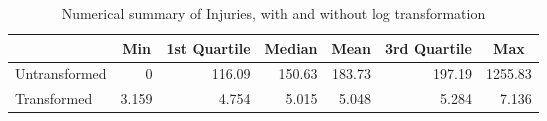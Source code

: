 \begin{table}[h!]
\centering
\begin{tabular}{|l|r|r|r|r|r|r|}
\hline
\rowcolor[HTML]{E7EAF6} 
\multicolumn{1}{|c|}{\textbf{}} & \multicolumn{1}{c|}{Min} & \multicolumn{1}{c|}{1st Quartile} & \multicolumn{1}{c|}{Median} & \multicolumn{1}{c|}{Mean} & \multicolumn{1}{c|}{3rd Quartile} & \multicolumn{1}{c|}{Max} \\ \hline
Untransformed & 0 & 116.09 & 150.63 & 183.73 & 197.19 & 1255.83 \\ \hline
Transformed & 3.159 & 4.754 & 5.015 & 5.048 & 5.284 & 7.136 \\ \hline
\end{tabular}
\caption{Numerical summary of Injuries, with and without log transformation}
\end{table}